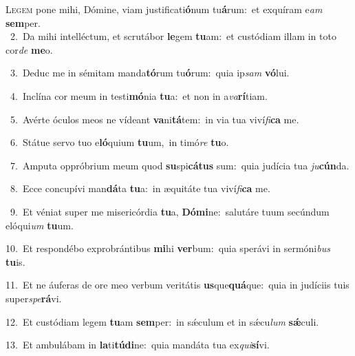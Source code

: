 \lettrine{\initial\textcolor{\initialcolor}{L}}{egem} pone mihi, Dómine, viam justificati\-\textbf{ó}\-num tu\-\textbf{á}\-rum:~\star et exquíram e\textit{am} \textbf{sem}\-per.\\
{\numbfont\textcolor{\numbcolor}{~2.}}~Da mihi intelléctum, et scrutábor \textbf{le}\-gem \textbf{tu}\-am:~\star et custódiam illam in toto cor\textit{de} \textbf{me}\-o.\par
{\numbfont\textcolor{\numbcolor}{~3.}}~Deduc me in sémitam manda\-\textbf{tó}\-rum tu\-\textbf{ó}\-rum:~\star quia ip\textit{sam} \textbf{vó}\-lui.\par
{\numbfont\textcolor{\numbcolor}{~4.}}~Inclína cor meum in testi\-\textbf{mó}\-nia \textbf{tu}\-a:~\star et non in a\-\textit{va}\-\textbf{rí}tiam.\par
{\numbfont\textcolor{\numbcolor}{~5.}}~Avérte óculos meos ne vídeant \textbf{va}\-ni\-\textbf{tá}\-tem:~\star in via tua viví\-\textit{fi}\-\textbf{ca} me.\par
{\numbfont\textcolor{\numbcolor}{~6.}}~Státue servo tuo e\-\textbf{ló}\-quium \textbf{tu}\-um,~\star in timó\textit{re} \textbf{tu}\-o.\par
{\numbfont\textcolor{\numbcolor}{~7.}}~Amputa oppróbrium meum quod \textbf{su}\-spi\-\textbf{cá}\-\textbf{tus} sum:~\star quia judícia tua \textit{ju}\-\textbf{cún}da.\par
{\numbfont\textcolor{\numbcolor}{~8.}}~Ecce concupívi man\-\textbf{dá}\-ta \textbf{tu}\-a:~\star in æquitáte tua viví\-\textit{fi}\-\textbf{ca} me.\par
{\numbfont\textcolor{\numbcolor}{~9.}}~Et véniat super me misericórdia \textbf{tu}\-a, \textbf{Dó}\-\textbf{mi}ne:~\star salutáre tuum secúndum elóqui\textit{um} \textbf{tu}\-um.\par
{\numbfont\textcolor{\numbcolor}{10.}}~Et respondébo exprobrántibus \textbf{mi}\-hi \textbf{ver}\-bum:~\star quia sperávi in sermóni\textit{bus} \textbf{tu}\-is.\par
{\numbfont\textcolor{\numbcolor}{11.}}~Et ne áuferas de ore meo verbum veritátis \textbf{us}\-que\-\textbf{quá}\-que:~\star quia in judíciis tuis super\-\textit{spe}\-\textbf{rá}vi.\par
{\numbfont\textcolor{\numbcolor}{12.}}~Et custódiam legem \textbf{tu}\-am \textbf{sem}\-per:~\star in sǽculum et in sǽcu\textit{lum} \textbf{sǽ}\-culi.\par
{\numbfont\textcolor{\numbcolor}{13.}}~Et ambulábam in \textbf{la}\-ti\-\textbf{tú}\-\textbf{di}ne:~\star quia mandáta tua ex\-\textit{qui}\-\textbf{sí}vi.\par
